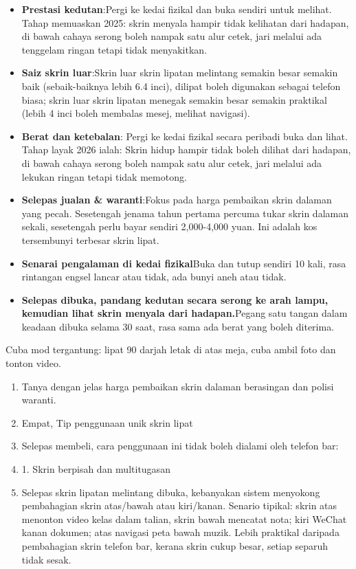 \begin{itemize}
  \item \textbf{Prestasi kedutan}:Pergi ke kedai fizikal dan buka sendiri untuk melihat. Tahap memuaskan 2025: skrin menyala hampir tidak kelihatan dari hadapan, di bawah cahaya serong boleh nampak satu alur cetek, jari melalui ada tenggelam ringan tetapi tidak menyakitkan.
  \item \textbf{Saiz skrin luar}:Skrin luar skrin lipatan melintang semakin besar semakin baik (sebaik-baiknya lebih 6.4 inci), dilipat boleh digunakan sebagai telefon biasa; skrin luar skrin lipatan menegak semakin besar semakin praktikal (lebih 4 inci boleh membalas mesej, melihat navigasi).
  \item \textbf{Berat dan ketebalan}: Pergi ke kedai fizikal secara peribadi buka dan lihat. Tahap layak 2026 ialah: Skrin hidup hampir tidak boleh dilihat dari hadapan, di bawah cahaya serong boleh nampak satu alur cetek, jari melalui ada lekukan ringan tetapi tidak memotong.
  \item \textbf{Selepas jualan \& waranti}:Fokus pada harga pembaikan skrin dalaman yang pecah. Sesetengah jenama tahun pertama percuma tukar skrin dalaman sekali, sesetengah perlu bayar sendiri 2,000-4,000 yuan. Ini adalah kos tersembunyi terbesar skrin lipat.
  \item \textbf{Senarai pengalaman di kedai fizikal}Buka dan tutup sendiri 10 kali, rasa rintangan engsel lancar atau tidak, ada bunyi aneh atau tidak.
  \item \textbf{Selepas dibuka, pandang kedutan secara serong ke arah lampu, kemudian lihat skrin menyala dari hadapan.}Pegang satu tangan dalam keadaan dibuka selama 30 saat, rasa sama ada berat yang boleh diterima.
\end{itemize}

\begin{tcbpractice}{Cuba mod tergantung: lipat 90 darjah letak di atas meja, cuba ambil foto dan tonton video.}
\begin{enumerate}
  \item Tanya dengan jelas harga pembaikan skrin dalaman berasingan dan polisi waranti.
  \item Empat, Tip penggunaan unik skrin lipat
  \item Selepas membeli, cara penggunaan ini tidak boleh dialami oleh telefon bar:
  \item 1. Skrin berpisah dan multitugasan
  \item Selepas skrin lipatan melintang dibuka, kebanyakan sistem menyokong pembahagian skrin atas/bawah atau kiri/kanan. Senario tipikal: skrin atas menonton video kelas dalam talian, skrin bawah mencatat nota; kiri WeChat kanan dokumen; atas navigasi peta bawah muzik. Lebih praktikal daripada pembahagian skrin telefon bar, kerana skrin cukup besar, setiap separuh tidak sesak.
\end{enumerate}

\end{tcbpractice}

